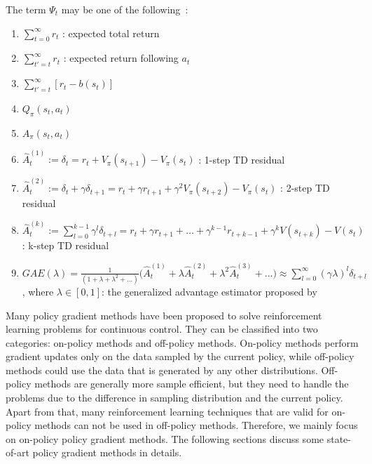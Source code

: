 The term $\Psi_t$ may be one of the following~\cite{schulman2015high}:
\begin{enumerate}
    \item $\sum_{t=0}^{\infty} r_t$  : expected total return
    \item $\sum_{t'=t}^{\infty} r_t$  : expected return following $a_t$
    \item $\sum_{t'=t}^{\infty} [r_t - b(s_t)]$
    \item $Q_\pi (s_t, a_t)$
    \item $A_\pi (s_t, a_t)$
    \item $ \hat{A}_t^{(1)}:=  \delta_t = r_t + V_\pi (s_{t+1}) - V_\pi (s_{t})$ : 1-step TD residual
    \item $ \hat{A}_t^{(2)} :=  \delta_t + \gamma \delta_{t+1}= r_t +\gamma r_{t+1} + \gamma^2 V_\pi (s_{t+2}) - V_\pi (s_{t})$ : 2-step TD residual
    \item $\hat{A}_t^{(k)} := \sum_{l=0}^{k-1} \gamma^{l} \delta_{t+l} =   r_t + \gamma r_{t+1} + \dots + \gamma^{k-1} r_{t+k-1} + \gamma^{k} V(s_{t+k}) -V(s_t)$ : k-step TD residual
    \item $GAE(\lambda) = \frac{1}{(1+\lambda+\lambda^2+\dots)} \big(\hat{A}_t^{(1)} + \lambda \hat{A}_t^{(2)}+ \lambda^2 \hat{A}_t^{(3)} +\dots \big) 
    \approx \sum_{l=0}^{\infty} (\gamma \lambda)^l \delta_{t+l}$ , where $\lambda \in [0,1]$: the generalized advantage estimator proposed by \cite{schulman2015high}
\end{enumerate}
Many policy gradient methods have been proposed to solve reinforcement learning problems for continuous control. They can be classified into two categories: on-policy methods and off-policy methods. On-policy methods perform gradient updates only on the data sampled by the current policy, while off-policy methods could use the data that is generated by any other distributions. Off-policy methods are generally more sample efficient, but they need to handle the problems due to the difference in sampling distribution and the current policy. Apart from that, many reinforcement learning techniques that are valid for on-policy methods can not be used in off-policy methods. Therefore, we mainly focus on on-policy policy gradient methods. The following sections discuss some state-of-art policy gradient methods in details.

